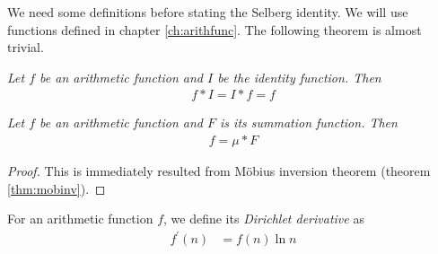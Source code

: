 \documentclass{subfile}
\begin{document}
	We need some definitions before stating the Selberg identity. We will use functions defined in chapter \eqref{ch:arithfunc}. The following theorem is almost trivial.
	\begin{theorem}\slshape
		Let $f$ be an arithmetic function and $I$ be the identity function. Then
			\begin{align*}
				f\ast I=I\ast f=f
			\end{align*}
	\end{theorem}

	\begin{theorem}\slshape
		\label{thm:dirichmobi}
		Let $f$ be an arithmetic function and $F$ is its summation function. Then
			\begin{align*}
				f=\mu\ast F
			\end{align*}
	\end{theorem}

	\begin{proof}
		This is immediately resulted from M\" obius inversion theorem (theorem \eqref{thm:mobinv}).
	\end{proof}

	\begin{definition}
		For an arithmetic function $f$, we define its \textit{Dirichlet derivative} as
			\begin{align*}
				f^\prime(n) & =f(n)\ln n
			\end{align*}
	\end{definition}
\end{document}

